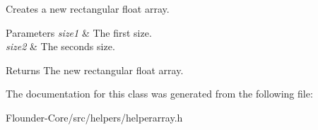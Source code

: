 Creates a new rectangular float array. 


\begin{DoxyParams}{Parameters}
{\em size1} & The first size. \\
\hline
{\em size2} & The seconds size. \\
\hline
\end{DoxyParams}
\begin{DoxyReturn}{Returns}
The new rectangular float array. 
\end{DoxyReturn}


The documentation for this class was generated from the following file\+:\begin{DoxyCompactItemize}
\item 
Flounder-\/\+Core/src/helpers/helperarray.\+h\end{DoxyCompactItemize}
